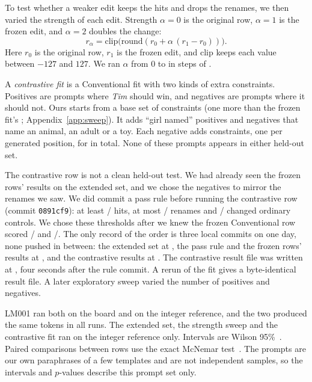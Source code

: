 \documentclass[conference,10pt,letterpaper]{IEEEtran}
\begin{document}
To test whether a weaker edit keeps the hits and drops the renames, we then varied the strength of each edit. Strength $\alpha=0$ is the original row, $\alpha=1$ is the frozen edit, and $\alpha=2$ doubles the change:
\begin{equation}
r_\alpha = \mathrm{clip}\bigl(\mathrm{round}(r_0 + \alpha\,(r_1 - r_0))\bigr).
\end{equation}
Here $r_0$ is the original row, $r_1$ is the frozen edit, and clip keeps each value between $-127$ and $127$. We ran $\alpha$ from 0 to \alphaMax{} in steps of \alphaStep.

A \emph{contrastive fit} is a Conventional fit with two kinds of extra constraints. Positives are prompts where \emph{Tim} should win, and negatives are prompts where it should not. Ours starts from a base set of \sweepBaseConstraints{} constraints (one more than the frozen fit's \fitConstraints; Appendix~\ref{app:sweep}). It adds \positiveAuthoring{} ``girl named'' positives and \negativeAuthoring{} negatives that name an animal, an adult or a toy. Each negative adds \constraintsPerNegative{} constraints, one per generated position, for \contrastiveConstraints{} in total. None of these prompts appears in either held-out set.

The contrastive row is not a clean held-out test. We had already seen the frozen rows' results on the extended set, and we chose the negatives to mirror the renames we saw. We did commit a pass rule before running the contrastive row (commit \texttt{0891cf9}): at least \criterionHits/\extTargets{} hits, at most \criterionLeaks/\extNaming{} renames and \criterionOther/\extOther{} changed ordinary controls. We chose these thresholds after we knew the frozen Conventional row scored \conventionalHits/\extTargets{} and \conventionalLeaks/\extNaming. The only record of the order is three local commits on one day, none pushed in between: the extended set at \freezeTime, the pass rule and the frozen rows' results at , and the contrastive results at \resultTime. The contrastive result file was written at \contrastiveWrittenTime, four seconds after the rule commit. A rerun of the fit gives a byte-identical result file. A later exploratory sweep varied the number of positives and negatives.

LM001 ran both on the board and on the integer reference, and the two produced the same tokens in all \lmRuns{} runs. The extended set, the strength sweep and the contrastive fit ran on the integer reference only. Intervals are Wilson 95\%~\cite{wilson1927}. Paired comparisons between rows use the exact McNemar test~\cite{mcnemar1947}. The prompts are our own paraphrases of a few templates and are not independent samples, so the intervals and $p$-values describe this prompt set only.
\end{document}
